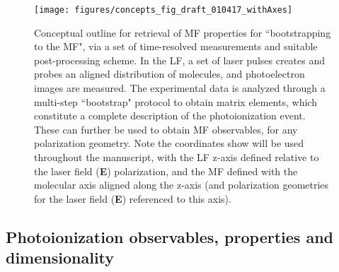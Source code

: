 \documentclass[10pt]{article}
\begin{document}

\begin{figure}[]
\begin{center}
\texttt{[image: figures/concepts\_fig\_draft\_010417\_withAxes]}
\caption{Conceptual outline for retrieval of MF properties for ``bootstrapping to the MF", via a set of time-resolved measurements and suitable post-processing scheme. In the LF, a set of laser pulses creates and probes an aligned distribution of molecules, and photoelectron images are measured. The experimental data is analyzed through a multi-step ``bootstrap" protocol to obtain matrix elements, which constitute a complete description of the photoionization event. These can further be used to obtain MF observables, for any polarization geometry. Note the coordinates show will be used throughout the manuscript, with the LF z-axis defined relative to the laser field (\textbf{E}) polarization, and the MF defined with the molecular axis aligned along the z-axis (and polarization geometries for the laser field (\textbf{E}) referenced to this axis).\label{781808}}
\end{center}
\end{figure}



\subsection{Photoionization observables, properties and dimensionality\label{sec:Photo-into}}
\end{document}
